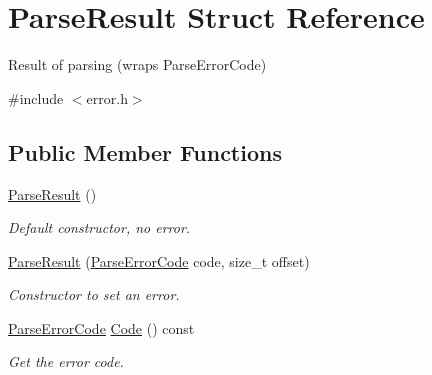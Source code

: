 \hypertarget{structParseResult}{}\section{Parse\+Result Struct Reference}
\label{structParseResult}


Result of parsing (wraps Parse\+Error\+Code)  




{\ttfamily \#include $<$error.\+h$>$}

\subsection*{Public Member Functions}
\begin{DoxyCompactItemize}
\item 
\mbox{\label{structParseResult_acd4a266f815bec59fa27f64f1923fe9e}} 
\hyperlink{structParseResult_acd4a266f815bec59fa27f64f1923fe9e}{Parse\+Result} ()
\begin{DoxyCompactList}\small\item\em Default constructor, no error. \end{DoxyCompactList}\item 
\mbox{\label{structParseResult_a38ca49a53e80633d0864ad5026adaf84}} 
\hyperlink{structParseResult_a38ca49a53e80633d0864ad5026adaf84}{Parse\+Result} (\hyperlink{group__RAPIDJSON__ERRORS_ga8d4b32dfc45840bca189ade2bbcb6ba7}{Parse\+Error\+Code} code, size\+\_\+t offset)
\begin{DoxyCompactList}\small\item\em Constructor to set an error. \end{DoxyCompactList}\item 
\mbox{\label{structParseResult_a2aae3c2f42b31cc2409ee1e03bc4852e}} 
\hyperlink{group__RAPIDJSON__ERRORS_ga8d4b32dfc45840bca189ade2bbcb6ba7}{Parse\+Error\+Code} \hyperlink{structParseResult_a2aae3c2f42b31cc2409ee1e03bc4852e}{Code} () const
\begin{DoxyCompactList}\small\item\em Get the error code. \end{DoxyCompactList}\item 
\mbox{\label{structParseResult_afbe762766ac21b2aae266105f1dfa643}} 

\end{DoxyCompactItemize}
